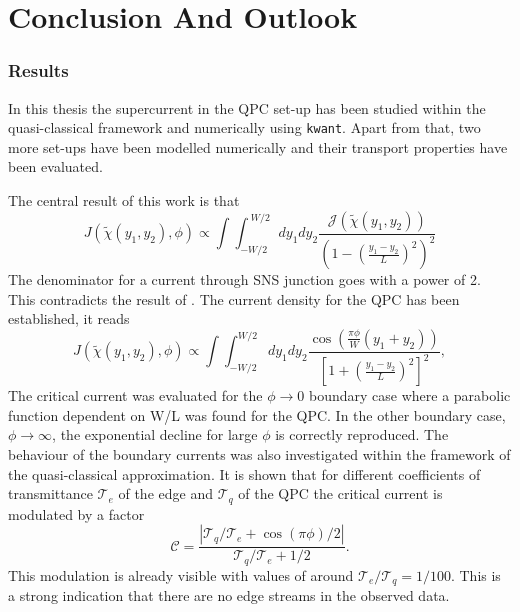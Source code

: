 \chapter{Conclusion And Outlook}
\label{ch:conclusion}

\subsection*{Results}
In this thesis the supercurrent in the QPC set-up has been studied within the quasi-classical framework and numerically using \texttt{kwant}. Apart from that, two more set-ups have been modelled numerically and their transport properties have been evaluated.

The central result of this work is that
\begin{equation}
J(\tilde{\chi}(y_1, y_2), \phi) \propto \int \int_{-W/2}^{~W/2} dy_1 dy_2 \frac{ \mathcal{J}(\tilde{\chi}(y_1, y_2)) }{ \left( 1 - \left(\frac{y_1 - y_2}{L}\right)^2 \right)^2 }
\end{equation}
The denominator for a current through SNS junction goes with a power of 2. This contradicts the result of \cite{Barzykin1999}. 
The current density for the QPC has been established, it reads
\begin{equation}
J(\tilde{\chi}(y_1, y_2), \phi) \propto \int \int_{-W/2}^{W/2} d y_1 d y_2 \frac{\cos \left( \frac{\pi \phi}{W}(y_1 + y_2) \right)}{\left[ 1 + \left(\frac{y_1 - y_2}{L}\right)^2\right]^2} \label{eq:josephson_current},
\end{equation}
The critical current was evaluated for the $\phi \rightarrow 0$ boundary case where a parabolic function dependent on W/L was found for the QPC. In the other boundary case, $\phi \rightarrow \infty$, the exponential decline for large $\phi$ is correctly reproduced. The behaviour of the boundary currents was also investigated within the framework of the quasi-classical approximation. It is shown that for different coefficients of transmittance $\mathcal{T}_e$ of the edge and $\mathcal{T}_q$ of the QPC the critical current is modulated by a factor 
\begin{equation}
\mathcal{C} =  \frac{| \mathcal{T}_q / \mathcal{T}_e + \cos \left( \pi \phi \right)/2 |}{\mathcal{T}_q / \mathcal{T}_e + 1/2}.
\end{equation}
This modulation is already visible with values of around $\mathcal{T}_e/ \mathcal{T}_q = 1 / 100$. This is a strong indication that there are no edge streams in the observed data. 

